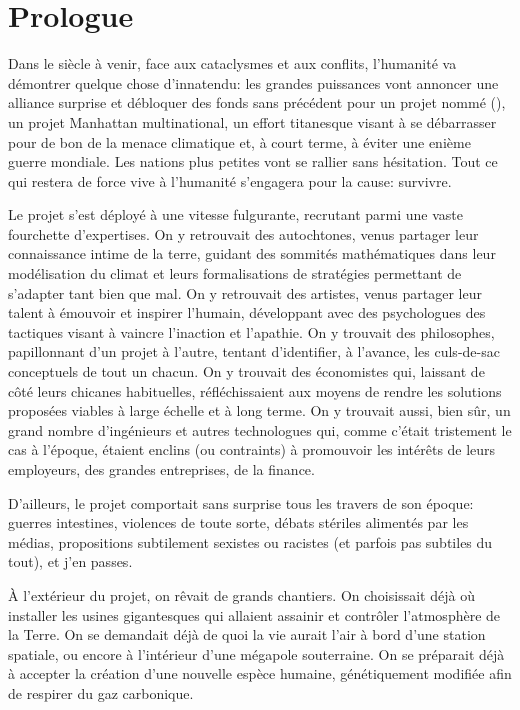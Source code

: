 \chapter*{Prologue}

Dans le siècle à venir, face aux cataclysmes et aux conflits, l'humanité va
démontrer quelque chose d'innatendu: les grandes puissances vont annoncer une
alliance surprise et débloquer des fonds sans précédent pour un projet nommé
\textit{\nomProjet{}} (\nomProjetEn{}), un projet Manhattan multinational, un
effort titanesque visant à se
débarrasser pour de bon de la menace climatique et, à court terme, 
à éviter une enième guerre mondiale.
Les nations plus
petites vont se rallier sans hésitation.  Tout ce qui restera de force vive à
l'humanité s'engagera pour la cause: survivre.

Le projet \nomProjet{} s'est déployé à une vi\-tesse
fulgurante, recrutant parmi une vaste fourchette d'expertises.  On y
retrouvait des autochtones, venus partager leur connaissance intime de la
terre, guidant des sommités mathé\-matiques dans leur modélisation du climat et
leurs formalisations de stra\-tégies permettant de s'adapter tant
bien que mal.  On y retrouvait des artistes, venus partager leur talent à
émouvoir et inspirer l'humain, développant avec des psychologues des
tactiques visant à vaincre l'in\-act\-ion et l'apathie.  On y trouvait des
philosophes, papillonnant d'un projet à l'autre, tentant d'identifier, à
l'avance, les culs-de-sac con\-cept\-uels de tout un chacun.  On y trouvait
des économistes qui, laissant de côté leurs chicanes habituelles,
réfléchissaient aux moyens de rendre les solutions proposées viables à
large échelle et à long terme.  On y trouvait aussi, bien sûr, un grand
nombre d'ingénieurs et autres technologues qui, comme c'était trist\-ement
le cas à l'époque, étaient enclins (ou contraints) à promouvoir les
intérêts de leurs employeurs, des grandes entreprises, de la finance.

D'ailleurs, le projet \nomProjet{} comportait sans surprise tous les
travers de son époque: guerres intestines, violences de toute sorte, débats
stériles alimentés par les médias, propositions
subti\-le\-ment sexistes ou racistes (et parfois pas subtiles du tout), et
j'en passes.

À l'extérieur du projet, on rêvait de grands chantiers.  On choisissait
déjà où installer les usines gigantesques qui allaient assainir et
contrô\-ler l'at\-mosphère de la Terre. On se demandait déjà de quoi la vie
aurait l'air à bord d'une station spatiale, ou encore à l'intérieur d'une
mégapole souterraine. On se préparait déjà à accepter la création d'une
nouvelle espèce humaine, génétiquement modifiée afin de respirer du gaz
carbo\-nique.

